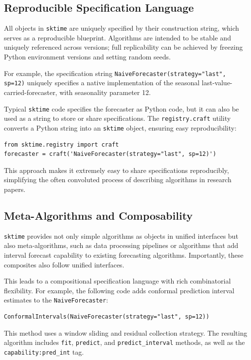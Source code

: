 \subsection{Reproducible Specification Language}
All objects in \texttt{sktime} are uniquely specified by their construction string, which serves as a reproducible blueprint. Algorithms are intended to be stable and uniquely referenced across versions; full replicability can be achieved by freezing Python environment versions and setting random seeds.

For example, the specification string 
\texttt{NaiveForecaster(strategy="last", sp=12)}
uniquely specifies a native implementation of the seasonal last-value-carried-forecaster, with seasonality parameter 12.

Typical \texttt{sktime} code specifies the forecaster as Python code, but it can also be used as a string to store or share specifications. The \texttt{registry.craft} utility converts a Python string into an \texttt{sktime} object, ensuring easy reproducibility:

\begin{verbatim}
from sktime.registry import craft
forecaster = craft('NaiveForecaster(strategy="last", sp=12)')
\end{verbatim}

This approach makes it extremely easy to share specifications reproducibly, simplifying the often convoluted process of describing algorithms in research papers.

\subsection{Meta-Algorithms and Composability}
\texttt{sktime} provides not only simple algorithms as objects in unified interfaces but also meta-algorithms, such as data processing pipelines or algorithms that add interval forecast capability to existing forecasting algorithms. Importantly, these composites also follow unified interfaces.

This leads to a compositional specification language with rich combinatorial flexibility. For example, the following code adds conformal prediction interval estimates to the \texttt{NaiveForecaster}:

\begin{verbatim}
ConformalIntervals(NaiveForecaster(strategy="last", sp=12))
\end{verbatim}

This method uses a window sliding and residual collection strategy. The resulting algorithm includes \texttt{fit}, \texttt{predict}, and \texttt{predict\_interval} methods, as well as the \texttt{capability:pred\_int} tag.

